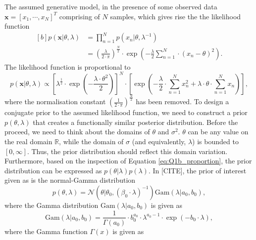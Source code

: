 \documentclass{article}
\begin{document}
The assumed generative model, in the presence of some observed data $\mathbf{x} = \left[x_1, \cdots, x_N \right]^T$ comprising of $N$ samples, which gives rise the the likelihood function
\begin{equation}
\begin{aligned}[b]
p(\mathbf{x} \vert \theta, \lambda) &= \prod_{n=1}^{N} p(x_n \vert \theta, \lambda^{-1}) \\
&= \left(\frac{\lambda}{2 \cdot \pi}\right)^{\frac{N}{2}} \cdot \exp \left( -\frac{\lambda}{2} \sum_{n=1}^{N} \cdot \left( x_n - \theta \right)^2 \right).
\end{aligned}
\end{equation}
The likelihood function is proportional to
\begin{equation}\label{eq:Q1b_proportion}
p(\mathbf{x} \vert \theta, \lambda) \propto \left[ \lambda^{\frac{1}{2}} \cdot \exp \left( -\frac{\lambda \cdot \theta^2}{2} \right)\right]^{N} \cdot \left[ \exp \left( - \frac{\lambda}{2} \cdot \sum_{n=1}^{N} x_n^2 + \lambda \cdot \theta \cdot \sum_{n=1}^{N}x_n \right) \right],
\end{equation}
where the normalisation constant $\left(\frac{1}{2 \cdot \pi}\right)^{\frac{N}{2}}$ has been removed. To design a conjugate prior to the assumed likelihood function, we need to construct a prior $p(\theta, \lambda)$ that creates a functionally similar posterior distribution. Before the proceed, we need to think about the domains of $\theta$ and $\sigma^2$. $\theta$ can be any value on the real domain $\mathbb{R}$, while the domain of $\sigma$ (and equivalently, $\lambda$) is bounded to $[0, \infty]$. Thus, the prior distribution should reflect this domain variation. Furthermore, based on the inspection of Equation \eqref{eq:Q1b_proportion}, the prior distribution can be expressed as $p(\theta \vert \lambda)p(\lambda)$. In [CITE], the prior of interest given as is the normal-Gamma distribution
\begin{equation}
p(\theta , \lambda) = \mathcal{N}\left( \theta \vert \theta_0, (\beta_0 \cdot \lambda)^{-1} \right)\text{Gam}\left( \lambda \vert a_0, b_0 \right),
\end{equation}
where the Gamma distribution $\text{Gam}\left( \lambda \vert a_0, b_0 \right)$ is given as
\begin{equation}
\text{Gam}\left( \lambda \vert a_0, b_0 \right) = \frac{1}{\Gamma(a_0)} \cdot b_{0}^{a_0} \cdot \lambda^{a_0 - 1} \cdot \exp \left( - b_0 \cdot \lambda \right),
\end{equation}
where the Gamma function $\Gamma(x)$ is given as
\end{document}
